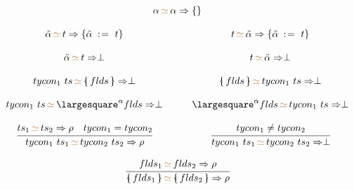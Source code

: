 \documentclass[11pt,a4paper]{article}
\newcommand{\record}[1]{\{\!\!\shortmid #1 \shortmid\!\!\}}
\newcommand{\irecrd}[2]{\largesquare^{#1}{#2}}
\newcommand{\tyvarsubst}[2]{#1\ \hspace{-0.2ex}:\hspace{1pt}=\ #2}
\newcommand{\rigdvar}[1]{\ddot{#1}}
\newcommand{\flexvar}[1]{\tilde#1}
\newcommand{\unify}[3]{#1\,{\color{brown}{\simeq}}\,#2 \Rightarrow #3}
\newcommand{\braced}[1]{\{#1\}}
\begin{document}
\[
\begin{array}{ccc}
 \multicolumn{3}{c}{\unify{\alpha}{\alpha}{\braced{}}} \\
 &                                                                                                          \\
 {\unify{\flexvar{\alpha}}{t}{\{\tyvarsubst{\flexvar\alpha}{t}\}}} & \quad & 
 {\unify{t}{\flexvar{\alpha}}{\{\tyvarsubst{\flexvar\alpha}{t}\}}}                                          \\
 &                                                                                                          \\
 {\unify{\rigdvar{\alpha}}{t}{\perp}} & \quad & 
 {\unify{t}{\rigdvar{\alpha}}{\perp}}                                                                       \\
 &                                                                                                          \\
 \unify{tycon_1\ ts}{\record{flds}}{\perp}     & \quad & \unify{\record{flds}}{tycon_1\ ts}{\perp}          \\      
 &                                                                                                          \\
 \unify{tycon_1\ ts}{\irecrd{\alpha}{flds}}{\perp} & \quad & \unify{\irecrd{\alpha}{flds}}{tycon_1\ ts}{\perp}  \\      
 &                                                                                                          \\
 \cfrac
  {\unify{ts_1}{ts_2}{\rho} \quad tycon_1 = tycon_2}
  {\unify{tycon_1\ ts_1}{tycon_2\ ts_2}{\rho}} & \quad &
 \cfrac
  {tycon_1 \ne tycon_2}
  {\unify{tycon_1\ ts_1}{tycon_2\ ts_2}{\perp}}                                                             \\
 &                                                                                                          \\
 \multicolumn{3}{c}{ \cfrac
  {\unify{flds_1}{flds_2}{\rho}}
  {\unify{\record{flds_1}}{\record{flds_2}}{\rho}} }                                                        \\
\end{array}
\]
\end{document}
